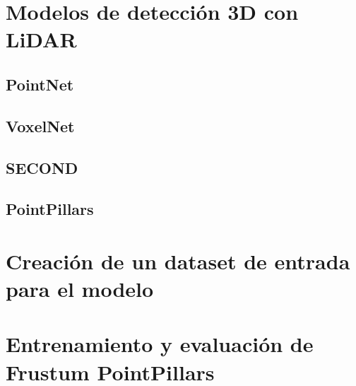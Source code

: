 \section{Modelos de detección 3D con LiDAR}
\label{sec:Modelos de detección 3D con LiDAR}

\subsection{PointNet}
\label{sec:PointNet}

\subsection{VoxelNet}
\label{sec:VoxelNet}

\subsection{SECOND}
\label{sec:SECOND}

\subsection{PointPillars}
\label{sec:PointPillars}


\section{Creación de un dataset de entrada para el modelo}
\label{sec:Creación de un dataset de entrada para el modelo}

\section{Entrenamiento y evaluación de Frustum PointPillars}
\label{sec:Entrenamiento y evaluación de Frustum PointPillars}
